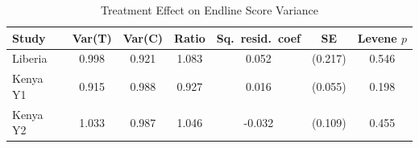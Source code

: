 \begin{table}[htbp]
\centering\small
\caption{Treatment Effect on Endline Score Variance}
\label{tab:variance}
\begin{tabular}{lcccccc}
\toprule
Study & Var(T) & Var(C) & Ratio & Sq.\ resid.\ coef & SE & Levene $p$ \\
\midrule
Liberia & 0.998 & 0.921 & 1.083 & 0.052 & (0.217) & 0.546 \\
Kenya Y1 & 0.915 & 0.988 & 0.927 & 0.016 & (0.055) & 0.198 \\
Kenya Y2 & 1.033 & 0.987 & 1.046 & -0.032 & (0.109) & 0.455 \\
\bottomrule
\end{tabular}
\par\smallskip{}
\end{table}